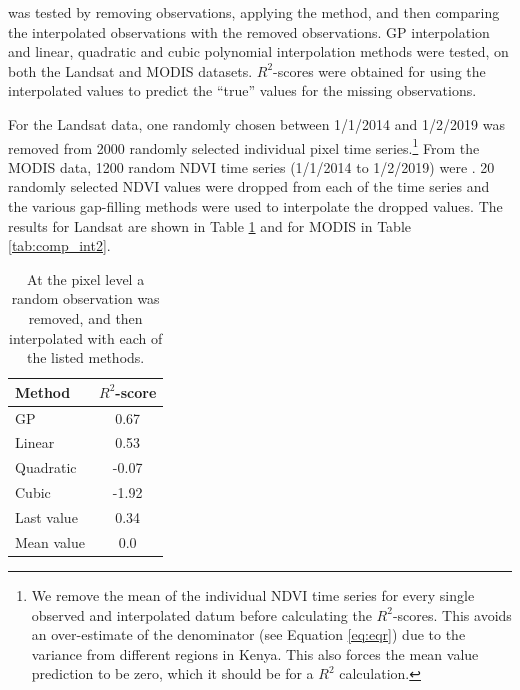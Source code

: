 \documentclass[review]{elsarticle}
\begin{document}
 was tested by removing observations, applying the method, and then comparing the interpolated observations with the removed observations. GP interpolation and linear, quadratic and cubic polynomial interpolation methods were tested, on both the Landsat and MODIS datasets. $R^2$-scores were obtained for using the interpolated values to predict the ``true'' values for the missing observations.


For the Landsat data, one randomly chosen  between 1/1/2014 and 1/2/2019 was removed from  2000 randomly selected individual pixel time series.\footnote{We remove the mean of the individual NDVI time series for every single observed and interpolated datum before calculating the $R^2$-scores. This avoids an over-estimate of the denominator (see Equation \ref{eq:eqr}) due to the variance from different regions in Kenya. This also forces the mean value prediction to be zero, which it should be for a $R^2$ calculation.} 
From the MODIS data, 1200 random  NDVI time series (1/1/2014 to 1/2/2019) were . 20 randomly selected NDVI values were dropped from each of the time series and the various gap-filling methods were used to interpolate the dropped values. The results for Landsat are shown in Table \ref{tab:comp_int} and for MODIS in Table \ref{tab:comp_int2}.



\begin{table}
	\caption{ At the pixel level a random observation was removed, and then interpolated with each of the listed methods.} \label{tab:comp_int}
	\centering
	\begin{tabular}{lc} 
		\toprule
		\textbf{Method}  & \textbf{$R^2$-score} \\
		\midrule
		GP & 0.67 \\
		Linear & 0.53 \\
		Quadratic & -0.07 \\
		Cubic & -1.92 \\
		Last value & 0.34 \\
		Mean value & 0.0 \\
		\bottomrule
	\end{tabular}
\end{table}
\end{document}
